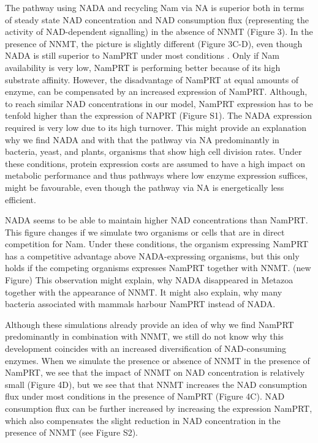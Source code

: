The pathway using NADA and recycling Nam via NA is superior  both in terms of steady state NAD concentration and NAD consumption flux (representing the activity of NAD-dependent signalling) in the absence of NNMT (Figure 3). In the presence of NNMT, the picture is slightly different (Figure 3C-D), even though NADA is still superior to NamPRT under most conditions . Only if Nam availability is very low, NamPRT is performing better because of its high substrate affinity. However, the disadvantage of NamPRT at equal amounts of enzyme, can be compensated by an increased expression of NamPRT. Although, to reach similar NAD concentrations in our model, NamPRT expression has to be tenfold higher than the expression of NAPRT (Figure S1). The NADA expression required is very low due to its high turnover. This might provide an explanation why we find NADA and with that the pathway via NA predominantly in bacteria, yeast, and plants, organisms that show high cell division rates. Under these conditions, protein expression costs are assumed to have a high impact on metabolic performance  and thus pathways where low enzyme expression suffices, might be favourable, even though the pathway via NA is energetically less efficient.

NADA seems to be able to maintain higher NAD concentrations than NamPRT. This figure changes if we simulate two organisms or cells that are in direct competition for Nam. Under these conditions, the organism expressing NamPRT has a competitive advantage above NADA-expressing organisms, but this only holds if the competing organisms expresses NamPRT together with NNMT. (new Figure) This observation might explain, why NADA disappeared in Metazoa together with the appearance of NNMT. It might also explain, why many bacteria associated with mammals harbour NamPRT instead of NADA.

Although these simulations already provide an idea of why we find NamPRT predominantly in combination with NNMT, we still do not know why this development coincides with an increased diversification of NAD-consuming enzymes. When we simulate the presence or absence of NNMT in the presence of NamPRT, we see that the impact of NNMT on NAD concentration is relatively small (Figure 4D), but we see that that NNMT increases the NAD consumption flux under most conditions in the presence of NamPRT (Figure 4C). NAD consumption flux can be further increased by increasing the expression NamPRT, which also compensates the slight reduction in NAD concentration in the presence of NNMT (see Figure S2).

